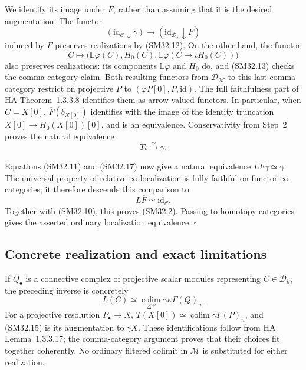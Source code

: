 \documentclass[11pt,a4paper]{article}
\theoremstyle{definition}\newtheorem{definition}[theorem]{Definition}
\theoremstyle{remark}\newtheorem{remark}[theorem]{Remark}
\begin{document}
We identify its image under \(\overline F\), rather than
assuming that it is the desired augmentation.  The functor
\[
 (\mathrm{id}_{\mathcal C}\downarrow\gamma)
       \longrightarrow(\mathrm{id}_{\mathcal D_k}\downarrow F)
\]
induced by \(\overline F\) preserves realizations by
(SM32.12).  On the other hand, the functor
\[
 C\longmapsto
 \bigl(\mathbb L\varphi(C),H_0(C),
       \mathbb L\varphi(C\to\iota H_0(C))\bigr)               \tag{SM32.16}
\]
also preserves realizations: its components
\(\mathbb L\varphi\) and \(H_0\) do, and (SM32.13)
checks the comma-category claim.  Both resulting functors from
\(\mathcal D_{\mathcal M}\) to this last comma category
restrict on projective \(P\) to
\((\varphi P[0],P,\mathrm{id})\).  The full faithfulness
part of HA Theorem~1.3.3.8 identifies them as arrow-valued
functors.  In particular, when \(C=X[0]\),
\(\overline F(b_{X[0]})\) identifies with the image of the
identity truncation \(X[0]\to H_0(X[0])[0]\), and is an
equivalence.  Conservativity from Step~2 proves the natural
equivalence
\[
                             T\iota\xrightarrow{\sim}\gamma. \tag{SM32.17}
\]

Equations (SM32.11) and (SM32.17) now give a natural equivalence
\(L\overline F\gamma\simeq\gamma\).  The universal property
of relative \(\infty\)-localization is fully faithful on
functor \(\infty\)-categories; it therefore descends this
comparison to
\[
                         L\overline F\simeq\mathrm{id}_{\mathcal C}.
                                                               \tag{SM32.18}
\]
Together with (SM32.10), this proves (SM32.2).
Passing to homotopy categories gives the asserted ordinary
localization equivalence. \(\square\)

\subsection{Concrete realization and exact limitations}
If \(Q_\bullet\) is a connective complex of projective scalar
modules representing \(C\in\mathcal D_k\), the preceding
inverse is concretely
\[
               L(C)\simeq
                  \operatorname*{colim}_{\Delta^{\mathrm{op}}}
                                      \gamma\kappa\Gamma(Q)_n.
                                                               \tag{SM32.19}
\]
For a projective resolution \(P_\bullet\to X\),
\(T(X[0])\simeq\operatorname*{colim}\gamma\Gamma(P)_n\),
and (SM32.15) is its augmentation to \(\gamma X\).
These identifications follow from HA Lemma~1.3.3.17; the
comma-category argument proves that their choices fit together
coherently.  No ordinary filtered colimit in \(\mathcal M\)
is substituted for either realization.
\end{document}
